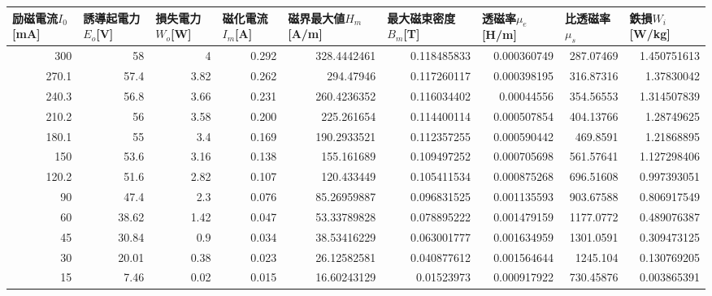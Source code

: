 \begin{tabular}{rrrrrrrrr}
\toprule
\multicolumn{1}{l}{励磁電流$I_0$[mA]} & \multicolumn{1}{l}{誘導起電力$E_o$[V]} & \multicolumn{1}{l}{損失電力$W_o$[W]} & \multicolumn{1}{l}{磁化電流$I_m$[A]} & \multicolumn{1}{l}{磁界最大値$H_m$[A/m]} & \multicolumn{1}{l}{最大磁束密度$B_m$[T]} & \multicolumn{1}{l}{透磁率$\mu_e$[H/m]} & \multicolumn{1}{l}{比透磁率$\mu_s$} & \multicolumn{1}{l}{鉄損$W_i$[W/kg]} \\
\midrule
300   & 58    & 4     & 0.292 & 328.4442461 & 0.118485833 & 0.000360749 & 287.07469 & 1.450751613 \\
270.1 & 57.4  & 3.82  & 0.262 & 294.47946 & 0.117260117 & 0.000398195 & 316.87316 & 1.37830042 \\
240.3 & 56.8  & 3.66  & 0.231 & 260.4236352 & 0.116034402 & 0.00044556 & 354.56553 & 1.314507839 \\
210.2 & 56    & 3.58  & 0.200 & 225.261654 & 0.114400114 & 0.000507854 & 404.13766 & 1.28749625 \\
180.1 & 55    & 3.4   & 0.169 & 190.2933521 & 0.112357255 & 0.000590442 & 469.8591 & 1.21868895 \\
150   & 53.6  & 3.16  & 0.138 & 155.161689 & 0.109497252 & 0.000705698 & 561.57641 & 1.127298406 \\
120.2 & 51.6  & 2.82  & 0.107 & 120.433449 & 0.105411534 & 0.000875268 & 696.51608 & 0.997393051 \\
90    & 47.4  & 2.3   & 0.076 & 85.26959887 & 0.096831525 & 0.001135593 & 903.67588 & 0.806917549 \\
60    & 38.62 & 1.42  & 0.047 & 53.33789828 & 0.078895222 & 0.001479159 & 1177.0772 & 0.489076387 \\
45    & 30.84 & 0.9   & 0.034 & 38.53416229 & 0.063001777 & 0.001634959 & 1301.0591 & 0.309473125 \\
30    & 20.01 & 0.38  & 0.023 & 26.12582581 & 0.040877612 & 0.001564644 & 1245.104 & 0.130769205 \\
15    & 7.46  & 0.02  & 0.015 & 16.60243129 & 0.01523973 & 0.000917922 & 730.45876 & 0.003865391 \\
\bottomrule
\end{tabular}